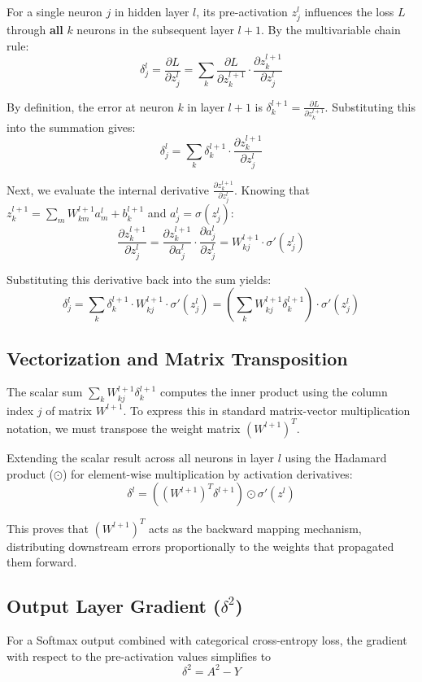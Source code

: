 \documentclass[11pt]{article}
\begin{document}
For a single neuron $j$ in hidden layer $l$, its pre-activation $z^l_j$ influences the loss $L$ through \textbf{all} $k$ neurons in the subsequent layer $l+1$. By the multivariable chain rule:
\[
\delta^l_j = \frac{\partial L}{\partial z^l_j} = \sum_k \frac{\partial L}{\partial z^{l+1}_k}\cdot\frac{\partial z^{l+1}_k}{\partial z^l_j}
\]

By definition, the error at neuron $k$ in layer $l+1$ is $\delta^{l+1}_k = \frac{\partial L}{\partial z^{l+1}_k}$. Substituting this into the summation gives:
\[
\delta^l_j = \sum_k \delta^{l+1}_k \cdot \frac{\partial z^{l+1}_k}{\partial z^l_j}
\]

Next, we evaluate the internal derivative $\frac{\partial z^{l+1}_k}{\partial z^l_j}$. Knowing that $z^{l+1}_k = \sum_m W^{l+1}_{km} a^l_m + b^{l+1}_k$ and $a^l_j = \sigma(z^l_j)$:
\[
\frac{\partial z^{l+1}_k}{\partial z^l_j} = \frac{\partial z^{l+1}_k}{\partial a^l_j}\cdot\frac{\partial a^l_j}{\partial z^l_j} = W^{l+1}_{kj}\cdot \sigma'(z^l_j)
\]

Substituting this derivative back into the sum yields:
\[
\delta^l_j = \sum_k \delta^{l+1}_k \cdot W^{l+1}_{kj}\cdot\sigma'(z^l_j) = \left(\sum_k W^{l+1}_{kj}\delta^{l+1}_k\right)\cdot\sigma'(z^l_j)
\]

\subsection{Vectorization and Matrix Transposition}

The scalar sum $\sum_k W^{l+1}_{kj}\delta^{l+1}_k$ computes the inner product using the column index $j$ of matrix $W^{l+1}$. To express this in standard matrix-vector multiplication notation, we must transpose the weight matrix $(W^{l+1})^T$.

Extending the scalar result across all neurons in layer $l$ using the Hadamard product ($\odot$) for element-wise multiplication by activation derivatives:
\[
\boxed{\delta^l = \left((W^{l+1})^T \delta^{l+1}\right) \odot \sigma'(z^l)}
\]

This proves that $(W^{l+1})^T$ acts as the backward mapping mechanism, distributing downstream errors proportionally to the weights that propagated them forward.

\subsection{Output Layer Gradient (\texorpdfstring{$\delta^2$}{delta 2})}

For a Softmax output combined with categorical cross-entropy loss, the gradient with respect to the pre-activation values simplifies to
\[
\delta^2 = A^2 - Y
\]
\end{document}
